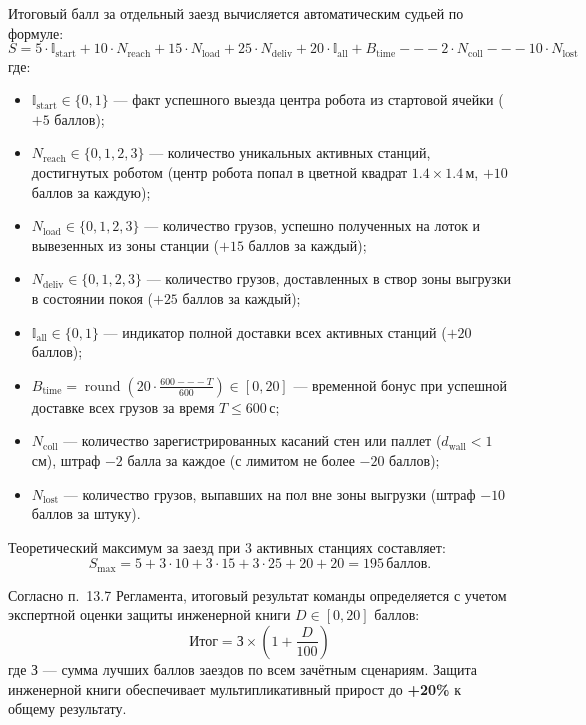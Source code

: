 \documentclass[a4paper,11pt]{article}
\begin{document}
Итоговый балл за отдельный заезд вычисляется автоматическим судьей по формуле:
\begin{equation}
S = 5 \cdot \mathbb{I}_{\text{start}} + 10 \cdot N_{\text{reach}} + 15 \cdot N_{\text{load}} + 25 \cdot N_{\text{deliv}} + 20 \cdot \mathbb{I}_{\text{all}} + B_{\text{time}} --- 2 \cdot N_{\text{coll}} --- 10 \cdot N_{\text{lost}}
\label{eq:score}
\end{equation}
где:
\begin{itemize}[noitemsep]
    \item $\mathbb{I}_{\text{start}} \in \{0, 1\}$ — факт успешного выезда центра робота из стартовой ячейки ($+5$ баллов);
    \item $N_{\text{reach}} \in \{0, 1, 2, 3\}$ — количество уникальных активных станций, достигнутых роботом (центр робота попал в цветной квадрат $1.4 \times 1.4$\,м, $+10$ баллов за каждую);
    \item $N_{\text{load}} \in \{0, 1, 2, 3\}$ — количество грузов, успешно полученных на лоток и вывезенных из зоны станции ($+15$ баллов за каждый);
    \item $N_{\text{deliv}} \in \{0, 1, 2, 3\}$ — количество грузов, доставленных в створ зоны выгрузки в состоянии покоя ($+25$ баллов за каждый);
    \item $\mathbb{I}_{\text{all}} \in \{0, 1\}$ — индикатор полной доставки всех активных станций ($+20$ баллов);
    \item $B_{\text{time}} = \operatorname{round}\left(20 \cdot \frac{600 --- T}{600}\right) \in [0, 20]$ — временной бонус при успешной доставке всех грузов за время $T \le 600$\,с;
    \item $N_{\text{coll}}$ — количество зарегистрированных касаний стен или паллет ($d_{\text{wall}} < 1$\,см), штраф $-2$ балла за каждое (с лимитом не более $-20$ баллов);
    \item $N_{\text{lost}}$ — количество грузов, выпавших на пол вне зоны выгрузки (штраф $-10$ баллов за штуку).
\end{itemize}

Теоретический максимум за заезд при 3 активных станциях составляет:
\begin{equation}
S_{\text{max}} = 5 + 3 \cdot 10 + 3 \cdot 15 + 3 \cdot 25 + 20 + 20 = 195\,\text{баллов}.
\end{equation}

Согласно п.~13.7 Регламента, итоговый результат команды определяется с учетом экспертной оценки защиты инженерной книги $D \in [0, 20]$ баллов:
\begin{equation}
\text{Итог} = \text{З} \times \left(1 + \frac{D}{100}\right)
\end{equation}
где $\text{З}$ — сумма лучших баллов заездов по всем зачётным сценариям. Защита инженерной книги обеспечивает мультипликативный прирост до \textbf{+20\%} к общему результату.
\end{document}
